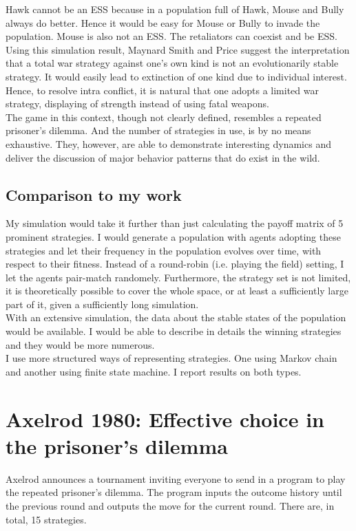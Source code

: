 \documentclass[12.5pt]{report}
\begin{document}
Hawk cannot be an ESS because in a population full of Hawk, Mouse and Bully always do better. Hence it would be easy for Mouse or Bully to invade the population. Mouse is also not an ESS. The retaliators can coexist and be ESS. \\

Using this simulation result, Maynard Smith and Price suggest the interpretation that a total war strategy against one’s own kind is not an evolutionarily stable strategy. It would easily lead to extinction of one kind due to individual interest. Hence, to resolve intra conflict, it is natural that one adopts a limited war strategy, displaying of strength instead of using fatal weapons.\\

The game in this context, though not clearly defined, resembles a repeated prisoner’s dilemma. And the number of strategies in use, is by no means exhaustive. They, however, are able to demonstrate interesting dynamics and deliver the discussion of major behavior patterns that do exist in the wild.\\

\subsection{Comparison to my work}
My simulation would take it further than just calculating the payoff matrix of 5 prominent strategies. I would generate a population with agents adopting these strategies and let their frequency in the population evolves over time, with respect to their fitness. Instead of a round-robin (i.e. playing the field) setting, I let the agents pair-match randomely. Furthermore, the strategy set is not limited, it is theoretically possible to cover the whole space, or at least a sufficiently large part of it, given a sufficiently long simulation.\\

With an extensive simulation, the data about the stable states of the population would be available. I would be able to describe in details the winning strategies and they would be more numerous.\\

I use more structured ways of representing strategies. One using Markov chain and another using finite state machine. I report results on both types.

\section{Axelrod 1980: Effective choice in the prisoner’s dilemma}
Axelrod announces a tournament inviting everyone to send in a program to play the repeated prisoner’s dilemma. The program inputs the outcome history until the previous round and outputs the move for the current round. There are, in total, 15 strategies. \\
\end{document}
